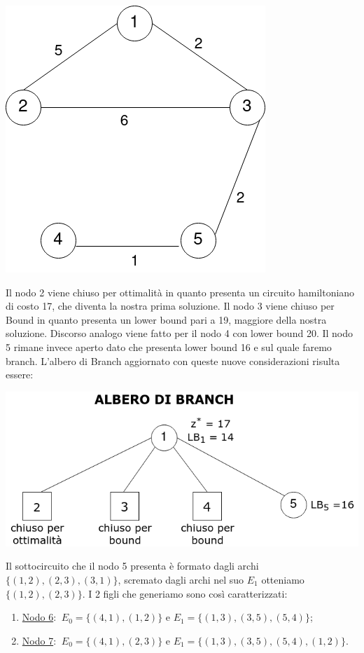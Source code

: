\documentclass[
    article,            %
    12pt,                %
    oneside,            %
    a4paper,            %
    english,            %
    italian,                %
    sumario=tradicional,
]{abntex2}
\begin{document}
\begin{center}
        \qquad
        \includegraphics[scale=0.26]{files/quinto1Tree}
    \end{center}
    Il nodo 2 viene chiuso per ottimalità in quanto presenta un circuito hamiltoniano di costo 17, che diventa la nostra prima soluzione.
    Il nodo 3 viene chiuso per Bound in quanto presenta un lower bound pari a 19, maggiore della nostra soluzione.
    Discorso analogo viene fatto per il nodo 4 con lower bound 20.
    Il nodo 5 rimane invece aperto dato che presenta lower bound 16 e sul quale faremo branch.
    \newline
    L'albero di Branch aggiornato con queste nuove considerazioni risulta essere:
    \begin{center}
        \includegraphics[scale=0.4]{files/alberoBranch2}
    \end{center}
    Il sottocircuito che il nodo 5 presenta è formato dagli archi $\{(1,2),(2,3),(3,1)\}$, scremato dagli archi nel suo $E_1$ otteniamo $\{(1,2),(2,3)\}$.
    I 2 figli che generiamo sono così caratterizzati:
    \begin{enumerate}
        \item [] \underline{Nodo 6}: $\:E_0 = \{(4,1),(1,2)\}$ e $E_1 = \{(1,3),(3,5),(5,4)\}$;
        \item [] \underline{Nodo 7}: $\:E_0 = \{(4,1),(2,3)\}$ e $E_1 = \{(1,3),(3,5),(5,4), (1,2)\}$.
    \end{enumerate}
\end{document}

